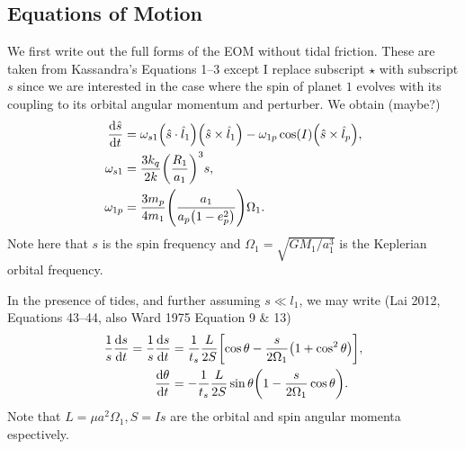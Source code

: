 \documentclass[11pt,
        usenames, %
        dvipsnames %
    ]{article}
\newcommand*{\rd}[2]{\frac{\mathrm{d}#1}{\mathrm{d}#2}}
\DeclarePairedDelimiter\p{\lparen}{\rparen}
\DeclarePairedDelimiter\s{\lbrack}{\rbrack}
\begin{document}
\subsection{Equations of Motion}

We first write out the full forms of the EOM without tidal friction. These are
taken from Kassandra's Equations 1--3 except I replace subscript $\star$ with
subscript $s$ since we are interested in the case where the spin of planet $1$
evolves with its coupling to its orbital angular momentum and perturber. We
obtain (maybe?)
\begin{align}
    \rd{\hat{s}}{t}
        &= \omega_{s1}\p*{\hat{s} \cdot \hat{l}_1}\p*{\hat{s} \times \hat{l}_1}
            - \omega_{1p}\cos(I)\p*{\hat{s} \times \hat{l}_p},\\
    \omega_{s1} &= \frac{3k_q}{2k} \p*{\frac{R_1}{a_1}}^3 s,\\
    \omega_{1p} &= \frac{3m_p}{4m_1}\p*{\frac{a_1}{a_p\p*{1 - e_p^2}}} \Omega_1.
\end{align}
Note here that $s$ is the spin frequency and $\Omega_1 =
\sqrt{GM_1/a_1^3}$ is the Keplerian orbital frequency.

In the presence of tides, and further assuming $s \ll l_1$, we may write (Lai
2012, Equations 43--44, also Ward 1975 Equation 9 \& 13)
\begin{align}
    \frac{1}{s}\rd{s}{t}
        = \frac{1}{s}\rd{s}{t}
        &= \frac{1}{t_s}\frac{L}{2S}\s*{\cos\theta
            - \frac{s}{2\Omega_1}\p*{1 + \cos^2\theta}},\\
    \rd{\theta}{t} &= -\frac{1}{t_s}\frac{L}{2S}
        \sin\theta\p*{1 - \frac{s}{2\Omega_1}\cos\theta}.
\end{align}
Note that $L = \mu a^2\Omega_1, S = Is$ are the orbital and spin angular momenta
espectively.
\end{document}
